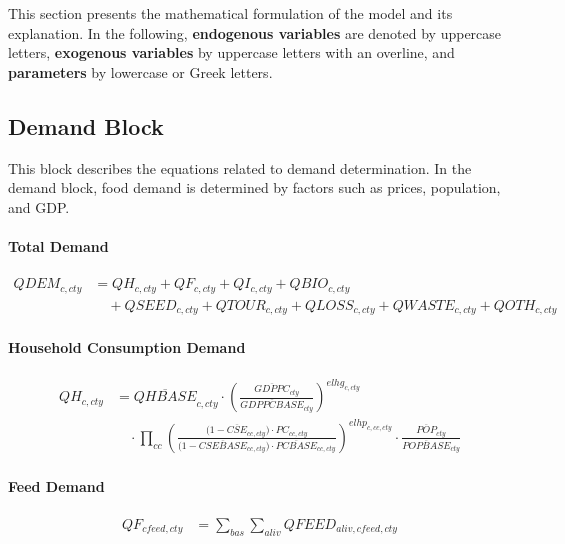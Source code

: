 This section presents the mathematical formulation of the model and its explanation.  
In the following, \textbf{endogenous variables} are denoted by uppercase letters,  
\textbf{exogenous variables} by uppercase letters with an overline, and  
\textbf{parameters} by lowercase or Greek letters.

\subsection{Demand Block}
This block describes the equations related to demand determination.  
In the demand block, food demand is determined by factors such as prices, population, and GDP.

\paragraph{Total Demand}
\begin{align}
  QDEM_{c,cty}
  &= QH_{c,cty} + QF_{c,cty} + QI_{c,cty} + QBIO_{c,cty} \nonumber\\
  &\quad + QSEED_{c,cty} + QTOUR_{c,cty} + QLOSS_{c,cty}
    + QWASTE_{c,cty} + QOTH_{c,cty}
  \tag{QDEMEQ}\label{eq:QDEMEQ}
\end{align}

\paragraph{Household Consumption Demand}
\begin{align}
  QH_{c,cty}
  &= \overline{QHBASE}_{c,cty}
     \cdot
     \left(\frac{\overline{GDPPC}_{cty}}{\overline{GDPPCBASE}_{cty}}\right)^{elhg_{c,cty}}
     \nonumber\\
  &\quad \cdot
     \prod_{cc}\!
     \left(
       \frac{\bigl(1-\overline{CSE}_{cc,cty}\bigr)\cdot PC_{cc,cty}}
            {\bigl(1-\overline{CSEBASE}_{cc,cty}\bigr)\cdot \overline{PCBASE}_{cc,cty}}
     \right)^{elhp_{c,cc,cty}}
     \cdot
     \frac{\overline{POP}_{cty}}{\overline{POPBASE}_{cty}}
  \tag{QHEQ}\label{eq:QHEQ}
\end{align}

\paragraph{Feed Demand}
\begin{align}
  QF_{cfeed,cty}
  &= \sum_{bas}\sum_{aliv} QFEED_{aliv,cfeed,cty}
  \tag{QFEEDEQ}\label{eq:QFEEDEQ}
\end{align}


